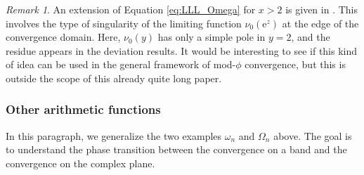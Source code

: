 \documentclass[12pt,a4paper,reqno]{amsart}
\theoremstyle{remark}
\newtheorem{remark}[lemma]{Remark}
\newcommand{\E}{\mathrm{e}}
\begin{document}
\begin{remark}
An extension of Equation \eqref{eq:LLL_Omega} for $x>2$ is given in \cite[Section II.6, Theorem 6]{Ten95}. This involves the type of singularity of the limiting function $\nu_0(\E^z)$ at the edge of the convergence domain. Here, $\nu_0(y)$ has only a simple pole in $y=2$, and the residue appears in the deviation results. It would be interesting to see if this kind of idea can be used in the general framework of mod-$\phi$ convergence, but this is outside the scope of this already quite long paper.
\end{remark}
\bigskip


\subsubsection{Other arithmetic functions}
In this paragraph, we generalize the two examples $\omega_n$ and $\Omega_n$ above. The goal is to understand the phase transition between the convergence on a band and the convergence on the complex plane.
\medskip
\end{document}

